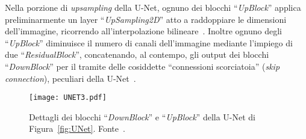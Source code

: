 Nella porzione di \emph{upsampling} della U-Net, ognuno dei blocchi “\emph{UpBlock}” applica preliminarmente un layer “\emph{UpSampling2D}” 
atto a raddoppiare le dimensioni dell'immagine, ricorrendo all'interpolazione bilineare~\cite{fosterGenerativeDeepLearning2023}.
Inoltre ognuno degli “\emph{UpBlock}” diminuisce 
il numero di canali dell'immagine mediante l'impiego di due “\emph{ResidualBlock}”, concatenando, al contempo, 
gli output dei blocchi “\emph{DownBlock}” per il tramite delle cosiddette “connessioni scorciatoia” (\emph{skip connection}), 
peculiari della U-Net~\cite{fosterGenerativeDeepLearning2023}.
\begin{figure}[t!]
    \centering
    \texttt{[image: UNET3.pdf]}
    \caption{Dettagli dei blocchi “\emph{DownBlock}” e “\emph{UpBlock}” della U-Net di Figura~\ref{fig:UNet}. Fonte~\cite{fosterGenerativeDeepLearning2023}.}
    \label{fig:UNet_details}
\end{figure}